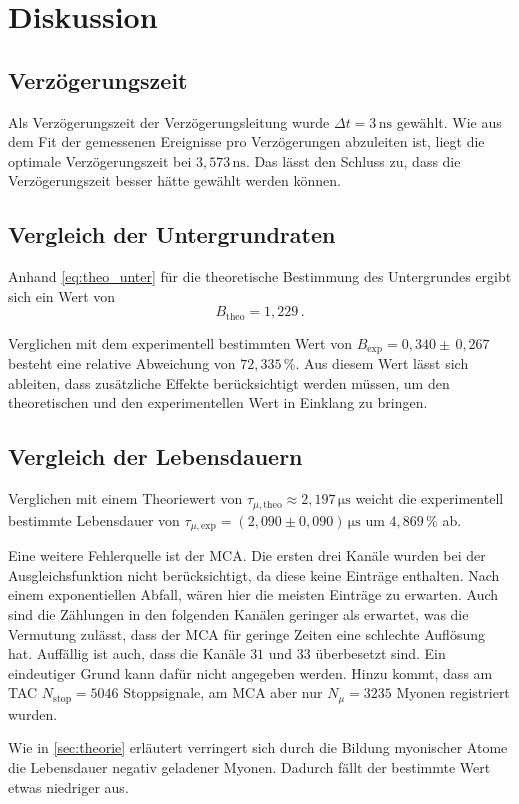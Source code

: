 \section{Diskussion}
\label{sec:Diskussion}

\subsection{Verzögerungszeit}

Als Verzögerungszeit der Verzögerungsleitung wurde $\Delta t = 3 \,\unit{\nano\second}$ gewählt.
Wie aus dem Fit der gemessenen Ereignisse pro Verzögerungen abzuleiten ist, liegt die optimale Verzögerungszeit bei
$3,573 \,\unit{\nano\second}$. Das lässt den Schluss zu, dass die Verzögerungszeit besser hätte gewählt werden können.


\subsection{Vergleich der Untergrundraten}

Anhand \eqref{eq:theo_unter} für die theoretische Bestimmung des Untergrundes ergibt sich ein Wert von
\begin{equation}
    B_\text{theo} = 1,229 \,.
\end{equation}

Verglichen mit dem experimentell bestimmten Wert von $B_\text{exp} = 0,340 \pm \, 0,267$ besteht eine relative Abweichung von
$72,335 \,\%$. Aus diesem Wert lässt sich ableiten, dass zusätzliche Effekte berücksichtigt werden müssen, um den theoretischen und den experimentellen Wert in Einklang zu bringen.

\subsection{Vergleich der Lebensdauern}

Verglichen mit einem Theoriewert von $\tau_{\mu,\text{theo}} \approx 2,197 \,\unit{\micro\second}$ \cite{pdg} weicht die experimentell bestimmte Lebensdauer von
$\tau_{\mu,\text{exp}} =  \left(2,090  \pm 0,090 \right) \,\unit{\micro\second}$ um $4,869 \,\%$  ab.

Eine weitere Fehlerquelle ist der MCA. Die ersten drei Kanäle wurden bei der Ausgleichsfunktion nicht berücksichtigt, da diese keine Einträge enthalten. Nach einem exponentiellen Abfall, wären hier die meisten Einträge zu erwarten. 
Auch sind die Zählungen in den folgenden Kanälen geringer als erwartet, was die Vermutung zulässt, dass der MCA für geringe Zeiten eine schlechte Auflösung hat.
Auffällig ist auch, dass die Kanäle $31$ und $33$ überbesetzt sind. Ein eindeutiger Grund kann dafür nicht angegeben werden.
Hinzu kommt, dass am TAC $N_\text{stop} = 5046$ Stoppsignale, am MCA aber nur $N_{\mu} = 3235$ Myonen registriert wurden.

Wie in \autoref{sec:theorie} erläutert verringert sich durch die Bildung myonischer Atome die Lebensdauer
negativ geladener Myonen. Dadurch fällt der bestimmte Wert etwas niedriger aus. \\


